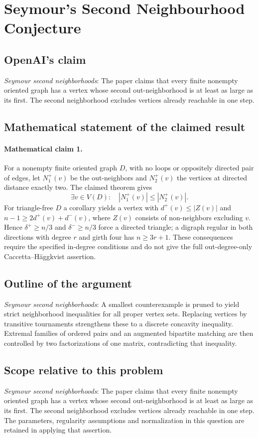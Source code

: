 \documentclass[11pt]{article}
\begin{document}
\section*{Seymour's Second Neighbourhood Conjecture}

\subsection{OpenAI's claim}
\textit{Seymour second neighborhoods}: The paper claims that every finite nonempty oriented graph has a vertex whose second out-neighborhood is at least as large as its first. The second neighborhood excludes vertices already reachable in one step.

\subsection{Mathematical statement of the claimed result}
\paragraph{Mathematical claim 1.} For a nonempty finite oriented graph $D$, with no loops or oppositely directed pair of edges, let $N_1^+(v)$ be the out-neighbors and $N_2^+(v)$ the vertices at directed distance exactly two. The claimed theorem gives \[\exists v\in V(D):\quad|N_1^+(v)|\le|N_2^+(v)|.\] For triangle-free $D$ a corollary yields a vertex with $d^+(v)\le|Z(v)|$ and $n-1\ge2d^+(v)+d^-(v)$, where $Z(v)$ consists of non-neighbors excluding $v$. Hence $\delta^+\ge n/3$ and $\delta^-\ge n/3$ force a directed triangle; a digraph regular in both directions with degree $r$ and girth four has $n\ge3r+1$. These consequences require the specified in-degree conditions and do not give the full out-degree-only Caccetta--H\"aggkvist assertion.

\subsection{Outline of the argument}
\textit{Seymour second neighborhoods}: A smallest counterexample is pruned to yield strict neighborhood inequalities for all proper vertex sets. Replacing vertices by transitive tournaments strengthens these to a discrete concavity inequality. Extremal families of ordered pairs and an augmented bipartite matching are then controlled by two factorizations of one matrix, contradicting that inequality.

\subsection{Scope relative to this problem}
\textit{Seymour second neighborhoods}: The paper claims that every finite nonempty oriented graph has a vertex whose second out-neighborhood is at least as large as its first. The second neighborhood excludes vertices already reachable in one step. The parameters, regularity assumptions and normalization in this question are retained in applying that assertion.
\end{document}
